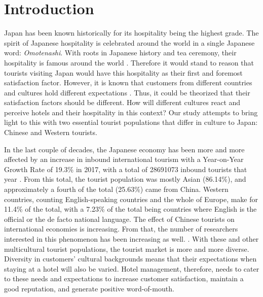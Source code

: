 \documentclass[smallextended,natbib]{svjour3}       %
\begin{document}
\linenumbers

\section{Introduction}\label{intro}

Japan has been known historically for its hospitality being the highest grade. The spirit of Japanese hospitality is celebrated around the world in a single Japanese word: \textit{Omotenashi}. With roots in Japanese history and tea ceremony, their hospitality is famous around the world \cite{al2015characteristics}. Therefore it would stand to reason that tourists visiting Japan would have this hospitality as their first and foremost satisfaction factor. However, it is known that customers from different countries and cultures hold different expectations \cite{engel1990}. Thus, it could be theorized that their satisfaction factors should be different. How will different cultures react and perceive hotels and their hospitality in this context? Our study attempts to bring light to this with two essential tourist populations that differ in culture to Japan: Chinese and Western tourists. 

In the last couple of decades, the Japanese economy has been more and more affected by an increase in inbound international tourism \cite[][]{jones2009} with a Year-on-Year Growth Rate of 19.3\% in 2017, with a total of \num[group-separator={,}]{28691073} inbound tourists that year \cite[][]{jnto2003-2019}. From this total, the tourist population was mostly Asian (86.14\%), and approximately a fourth of the total (25.63\%) came from China. Western countries, counting English-speaking countries and the whole of Europe, make for 11.4\% of the total, with a 7.23\% of the total being countries where English is the official or the de facto national language. The effect of Chinese tourists on international economies is increasing. From that, the number of researchers interested in this phenomenon has been increasing as well. \cite[][]{sun2017}. With these and other multicultural tourist populations, the tourist market is more and more diverse. Diversity in customers' cultural backgrounds means that their expectations when staying at a hotel will also be varied. Hotel management, therefore, needs to cater to these needs and expectations to increase customer satisfaction, maintain a good reputation, and generate positive word-of-mouth.
\end{document}
